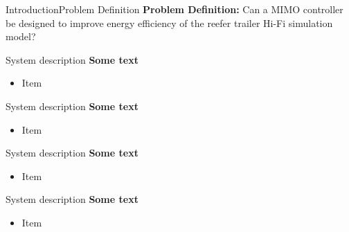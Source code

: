 \begin{frame}{Introduction}{Problem Definition}
	\textbf{Problem Definition:} Can a MIMO controller be designed to improve energy efficiency of the reefer trailer Hi-Fi simulation model?
\end{frame}

\begin{frame}{System description}{}
	\textbf{Some text}
	\begin{itemize}
		\item Item
	\end{itemize}
\end{frame}

\begin{frame}{System description}{}
	\textbf{Some text}
	\begin{itemize}
		\item Item
	\end{itemize}
\end{frame}

\begin{frame}{System description}{}
	\textbf{Some text}
	\begin{itemize}
		\item Item
	\end{itemize}
\end{frame}

\begin{frame}{System description}{}
	\textbf{Some text}
	\begin{itemize}
		\item Item
	\end{itemize}
\end{frame}

%
%
%
